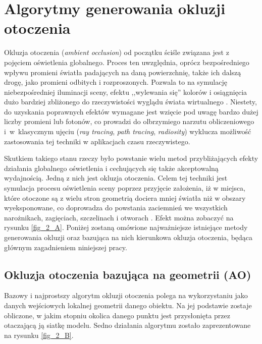 \chapter{Algorytmy generowania okluzji otoczenia}
\label{t:teoria}

Okluzja otoczenia (\textit{ambient occlusion}) od początku ściśle związana jest z pojęciem oświetlenia globalnego. Proces ten uwzględnia, oprócz bezpośredniego wpływu promieni światła padających na daną powierzchnię, także ich dalszą drogę, jako promieni odbitych i rozproszonych. Pozwala to na symulację niebezpośredniej iluminacji sceny, efektu ,,wylewania się'' kolorów i osiągnięcia dużo bardziej zbliżonego do rzeczywistości wyglądu świata wirtualnego \cite{global-illum}. Niestety, do uzyskania poprawnych efektów wymagane jest wzięcie pod uwagę bardzo dużej liczby promieni lub fotonów, co prowadzi do olbrzymiego narzutu obliczeniowego i~w~klasycznym ujęciu (\textit{ray tracing}, \textit{path tracing}, \textit{radiosity}) wyklucza możliwość zastosowania tej techniki w aplikacjach czasu rzeczywistego.

Skutkiem takiego stanu rzeczy było powstanie wielu metod przybliżających efekty działania globalnego oświetlenia i cechujących się także akceptowalną wydajnością. Jedną z nich jest okluzja otoczenia. Celem tej techniki jest symulacja procesu oświetlenia sceny poprzez przyjęcie założenia, iż w miejsca, które otoczone są z wielu stron geometrią dociera mniej światła niż w obszary wyeksponowane, co doprowadza do powstania zaciemnień we wszystkich narożnikach, zagięciach, szczelinach i otworach \cite{ao}. Efekt można zobaczyć na rysunku \ref{fig_2_A}. Poniżej zostaną omówione najważniejsze istniejące metody generowania okluzji oraz bazująca na nich kierunkowa okluzja otoczenia, będąca głównym zagadnieniem niniejszej pracy.


	\section{Okluzja otoczenia bazująca na geometrii (AO)}
	\label{t:teoria:geom}
	
	Bazowy i najprostszy algorytm okluzji otoczenia polega na wykorzystaniu jako danych wejściowych lokalnej geometrii danego obiektu. Na jej podstawie zostaje obliczone, w jakim stopniu okolica danego punktu jest przysłonięta przez otaczającą ją siatkę modelu. Sedno działania algorytmu zostało zaprezentowane na rysunku \ref{fig_2_B}.
	
